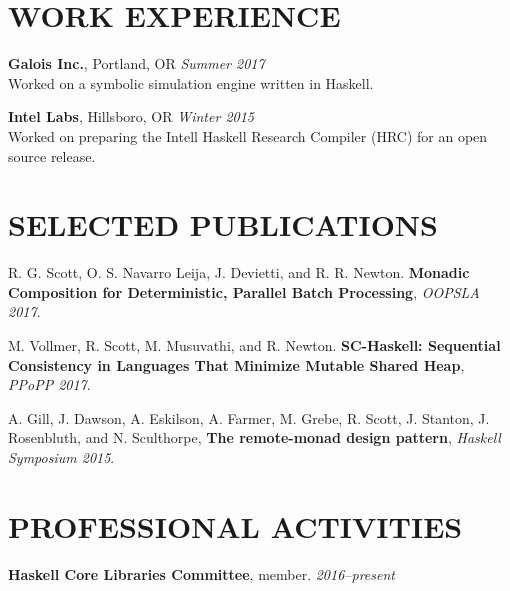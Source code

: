 \documentclass{res}
\begin{document}
\begin{resume}

\section{WORK EXPERIENCE}
    \textbf{Galois Inc.}, Portland, OR \hfill \textit{Summer 2017} \\
    Worked on a symbolic simulation engine written in Haskell.

    \textbf{Intel Labs}, Hillsboro, OR \hfill \textit{Winter 2015} \\
    Worked on preparing the Intell Haskell Research Compiler (HRC) for an open source release.

\section{SELECTED PUBLICATIONS}
        R. G. Scott, O. S. Navarro Leija, J. Devietti, and R. R. Newton. \textbf{Monadic Composition for Deterministic, Parallel Batch Processing}, \textit{OOPSLA 2017}.

        M. Vollmer, R. Scott, M. Musuvathi, and R. Newton. \textbf{SC-Haskell: Sequential Consistency in Languages That Minimize Mutable Shared Heap}, \textit{PPoPP 2017}.
        
        A. Gill, J. Dawson, A. Eskilson, A. Farmer, M. Grebe, R. Scott, J. Stanton, J. Rosenbluth, and N. Sculthorpe, \textbf{The remote-monad design pattern}, \textit{Haskell Symposium 2015}.

\section{PROFESSIONAL ACTIVITIES}
    \textbf{Haskell Core Libraries Committee}, member. \hfill \textit{2016--present}


\end{resume}
\end{document}

